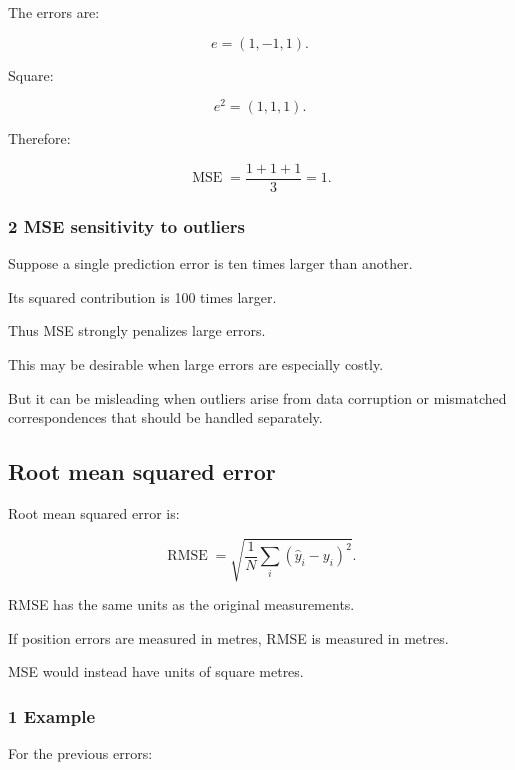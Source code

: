 The errors are:

\[
 e=(1,-1,1).
\]

Square:

\[
 e^2=(1,1,1).
\]

Therefore:

\[
 \boxed{ \operatorname{MSE}= \frac{1+1+1}{3}=1 }.
\]

\subsubsection{2 MSE sensitivity to outliers}\label{02-foundations-ii-ch030-mse-sensitivity-to-outliers}

\hypertarget{02-foundations-ii-ch030-mse-sensitivity-to-outliers}{}

Suppose a single prediction error is ten times larger than another.

Its squared contribution is 100 times larger.

Thus MSE strongly penalizes large errors.

This may be desirable when large errors are especially costly.

But it can be misleading when outliers arise from data corruption or mismatched correspondences that should be handled separately.

\subsection{Root mean squared error}\label{02-foundations-ii-ch030-root-mean-squared-error}

\hypertarget{02-foundations-ii-ch030-root-mean-squared-error}{}

Root mean squared error is:

\[
 \boxed{ \operatorname{RMSE} = \sqrt{ \frac1N\sum_i(\hat y_i-y_i)^2 } }.
\]

RMSE has the same units as the original measurements.

If position errors are measured in metres, RMSE is measured in metres.

MSE would instead have units of square metres.

\begin{allmightroleexample}

\subsubsection{1 Example}\label{02-foundations-ii-ch030-example}

\hypertarget{02-foundations-ii-ch030-example}{}

For the previous errors:

\end{allmightroleexample}

